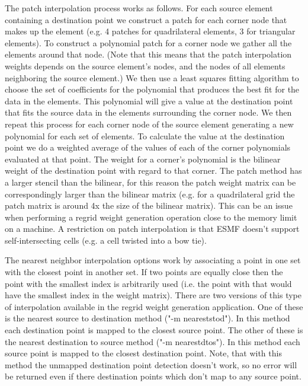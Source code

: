 The patch interpolation process works as follows.
For each source element containing a destination point
we construct a patch for each corner node that makes up the element (e.g. 4 patches for
quadrilateral elements, 3 for triangular elements). To construct a polynomial patch for
 a corner node we gather all the elements around that node.
(Note that this means that the patch interpolation weights depends on the source
element's nodes, and the nodes of all elements neighboring the source element.)
We then use a least squares fitting algorithm to choose the set of coefficients
for the polynomial that produces the best fit for the data in the elements.
This polynomial will give a value at the destination point that fits the source data
in the elements surrounding the corner node. We then repeat this process for each
corner node of the source element generating a new polynomial for each set of elements.
To calculate the value at the destination point we do a weighted average of the values
of each of the corner polynomials evaluated at that point. The weight for a corner's
polynomial is the bilinear weight of the destination point with regard to that corner.
The patch method has a larger stencil than the bilinear, for this reason the patch weight matrix can be correspondingly larger
than the bilinear matrix (e.g. for a quadrilateral grid the patch matrix is around 4x the size of
the bilinear matrix). This can be an issue when performing a regrid weight generation operation close to the memory
limit on a machine. A restriction on patch interpolation is that ESMF doesn't support self-intersecting cells (e.g. a cell twisted into a 
bow tie). 

The nearest neighbor interpolation options work by associating a point in one set with the closest point in another set. If two points are equally
close then the point with the smallest index is arbitrarily used (i.e. the point with that would have the smallest index in the weight matrix). There are two
versions of this type of interpolation available in the regrid weight generation application. One of these is the nearest source to destination
method ("-m neareststod"). In this method each destination point is mapped to the closest source point. The other of these is the
nearest destination to source method ("-m nearestdtos"). In this method each source point is mapped to the closest destination point. Note,
that with this method the unmapped destination point detection doesn't work, so no error will be returned even if there destination points
which don't map to any source point.

